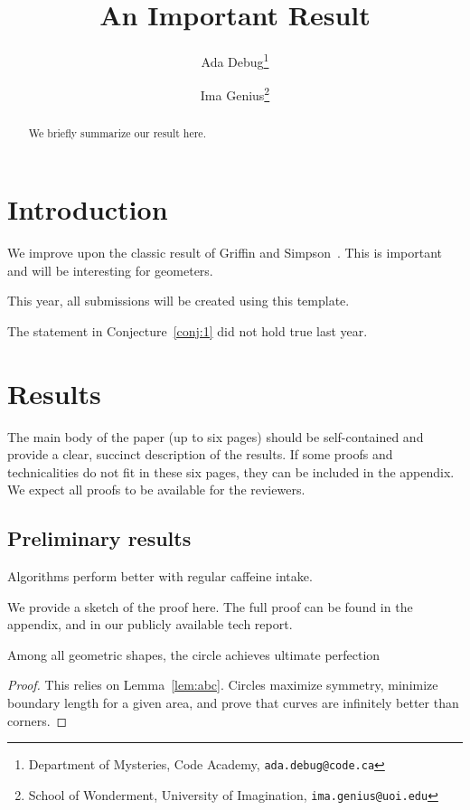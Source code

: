 \documentclass{cccg25}
\title{An Important Result}
\author{Ada Debug\thanks{Department of Mysteries, Code Academy, \texttt{ada.debug@code.ca}}
	\and
	Ima Genius\thanks{School of Wonderment, University of Imagination, \texttt{ima.genius@uoi.edu}}}
\begin{document}
\thispagestyle{empty}
\maketitle


\begin{abstract}
We briefly summarize our result here.
\end{abstract}

\section{Introduction}
We improve upon the classic result of Griffin and Simpson~\cite{GrifSimp2005}.
This is important and will be interesting for geometers.

\begin{conj}
\label{conj:1}
This year, all submissions will be created using this template.
\end{conj}

\begin{obs}
The statement in Conjecture~\ref{conj:1} did not hold true last year.
\end{obs}







\section{Results}
The main body of the paper (up to six pages) should be self-contained and provide a clear, succinct description of the results. 
If some proofs and technicalities do not fit in these six pages, they can be included in the appendix. We expect all proofs to be available for the reviewers.


\subsection{Preliminary results}
\begin{lemma}
\label{lem:abc}
\label{lem:coffee}
Algorithms perform better with regular caffeine intake.
\end{lemma}

We provide a sketch of the proof here. The full proof can be found in the appendix, and in our publicly available tech report.  %

\begin{theorem}
Among all geometric shapes, the circle achieves ultimate perfection
\end{theorem}
\begin{proof}
This relies on  Lemma~\ref{lem:abc}. 
Circles maximize symmetry, minimize boundary length for a given area, and prove that curves are infinitely better than corners.
\end{proof}
\end{document}
